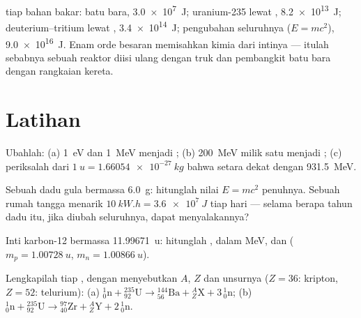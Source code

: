 \begin{example}\label{ex:g12:nuclear-energy:ladder}
 tiap  bahan bakar: batu bara, \qty{3.0e7}{J}; uranium-235 lewat ,
\qty{8.2e13}{J}; deuterium--tritium lewat , \qty{3.4e14}{J}; pengubahan
seluruhnya ($E = mc^2$), \qty{9.0e16}{J}. Enam orde besaran memisahkan
kimia dari intinya --- itulah sebabnya sebuah reaktor diisi ulang dengan truk
dan pembangkit batu bara dengan rangkaian kereta.
\end{example}

\section{Latihan}

\begin{exercise}[$\star$]\label{exo:g12:nuclear-energy:1}
Ubahlah: (a) \qty{1}{eV} dan \qty{1}{MeV} menjadi ; (b) \qty{200}{MeV} milik
satu  menjadi ; (c) periksalah dari $\qty{1}{u} = \qty{1.66054e-27}{kg}$
bahwa setara  dekat dengan \qty{931.5}{MeV}.
\end{exercise}

\begin{exercise}[$\star$]\label{exo:g12:nuclear-energy:2}
Sebuah dadu gula bermassa \qty{6.0}{g}: hitunglah nilai $E = mc^2$ penuhnya. Sebuah
rumah tangga menarik $\qty{10}{kW.h} = \qty{3.6e7}{J}$ tiap hari --- selama berapa
tahun dadu itu, jika diubah seluruhnya, dapat menyalakannya?
\end{exercise}

\begin{exercise}[$\star$]\label{exo:g12:nuclear-energy:3}
Inti karbon-12 bermassa \qty{11.99671}{u}: hitunglah ,
 dalam \unit{MeV}, dan 
($m_p = \qty{1.00728}{u}$, $m_n = \qty{1.00866}{u}$).
\end{exercise}

\begin{exercise}[$\star$]\label{exo:g12:nuclear-energy:4}
Lengkapilah tiap , dengan menyebutkan $A$, $Z$ dan unsurnya ($Z = 36$: kripton,
$Z = 52$: telurium):
(a) ${}^{1}_{0}\mathrm{n} + {}^{235}_{92}\mathrm{U} \to
{}^{144}_{56}\mathrm{Ba} + {}^{A}_{Z}\mathrm{X} + 3\,{}^{1}_{0}\mathrm{n}$;
(b) ${}^{1}_{0}\mathrm{n} + {}^{235}_{92}\mathrm{U} \to
{}^{97}_{40}\mathrm{Zr} + {}^{A}_{Z}\mathrm{Y} + 2\,{}^{1}_{0}\mathrm{n}$.
\end{exercise}


